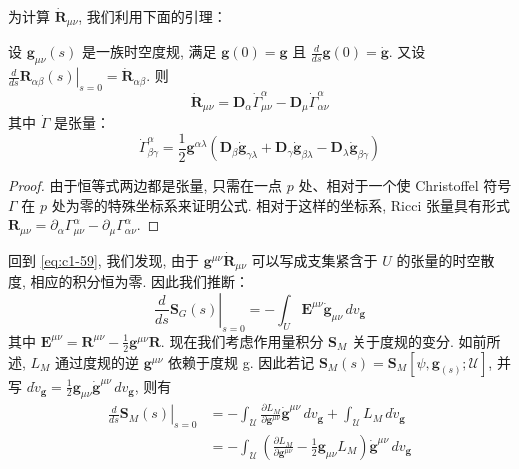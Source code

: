 为计算 $\dot{\mathbf{R}}_{\mu\nu}$, 我们利用下面的引理：

\begin{lemma}\label{lem:c1-1.2}
设 $\mathbf{g}_{\mu\nu}(s)$ 是一族时空度规, 满足 $\mathbf{g}(0) = \mathbf{g}$ 且 $\left.\frac{d}{ds}\mathbf{g}(0)\right. = \dot{\mathbf{g}}$. 又设 $\left.\frac{d}{ds}\mathbf{R}_{\alpha\beta}(s)\right|_{s=0} = \dot{\mathbf{R}}_{\alpha\beta}$. 则
\[
\dot{\mathbf{R}}_{\mu\nu} = \mathbf{D}_\alpha\dot{\Gamma}^\alpha_{\mu\nu} - \mathbf{D}_\mu\dot{\Gamma}^\alpha_{\alpha\nu}
\]
其中 $\dot{\Gamma}$ 是张量：
\[
\dot{\Gamma}^\alpha_{\beta\gamma} = \frac{1}{2}\mathbf{g}^{\alpha\lambda}\left(\mathbf{D}_\beta\dot{\mathbf{g}}_{\gamma\lambda} + \mathbf{D}_\gamma\dot{\mathbf{g}}_{\beta\lambda} - \mathbf{D}_\lambda\dot{\mathbf{g}}_{\beta\gamma}\right)
\]
\end{lemma}

\begin{proof}
由于恒等式两边都是张量, 只需在一点 $p$ 处、相对于一个使 Christoffel 符号 $\Gamma$ 在 $p$ 处为零的特殊坐标系来证明公式. 相对于这样的坐标系, Ricci 张量具有形式 $\mathbf{R}_{\mu\nu} = \partial_\alpha\Gamma^\alpha_{\mu\nu} - \partial_\mu\Gamma^\alpha_{\alpha\nu}$. 
\end{proof}

回到 \eqref{eq:c1-59}, 我们发现, 由于 $\mathbf{g}^{\mu\nu}\dot{\mathbf{R}}_{\mu\nu}$ 可以写成支集紧含于 $U$ 的张量的时空散度, 相应的积分恒为零. 因此我们推断：
\begin{equation}
\left.\frac{d}{ds}\mathbf{S}_G(s)\right|_{s=0} = -\int_{U}\mathbf{E}^{\mu\nu}\dot{\mathbf{g}}_{\mu\nu}\, dv_{\mathbf{g}}\label{eq:c1-60}
\end{equation}
其中 $\mathbf{E}^{\mu\nu} = \mathbf{R}^{\mu\nu} - \textstyle\frac{1}{2}\mathbf{g}^{\mu\nu}\mathbf{R}$. 现在我们考虑作用量积分 $\mathbf{S}_M$ 关于度规的变分. 如前所述, $L_M$ 通过度规的逆 $\mathbf{g}^{\mu\nu}$ 依赖于度规 g. 因此若记 $\mathbf{S}_M(s) = \mathbf{S}_M[\psi, \mathbf{g}_{(s)};\mathcal{U}]$, 并写 $d\dot{v}_{\mathbf{g}} = \frac{1}{2}\mathbf{g}_{\mu\nu}\dot{\mathbf{g}}^{\mu\nu}\, dv_{\mathbf{g}}$, 则有
\[
\begin{aligned}
\left.\frac{d}{ds}\mathbf{S}_M(s)\right|_{s=0} &= -\int_{\mathcal{U}}\frac{\partial L_M}{\partial\mathbf{g}^{\mu\nu}}\dot{\mathbf{g}}^{\mu\nu}\, dv_{\mathbf{g}} + \int_{\mathcal{U}}L_M\, d\dot{v}_{\mathbf{g}}\\
&= -\int_{\mathcal{U}}\left(\frac{\partial L_M}{\partial\mathbf{g}^{\mu\nu}} - \frac{1}{2}\mathbf{g}_{\mu\nu}L_M\right)\dot{\mathbf{g}}^{\mu\nu}\, dv_{\mathbf{g}}
\end{aligned}
\]


